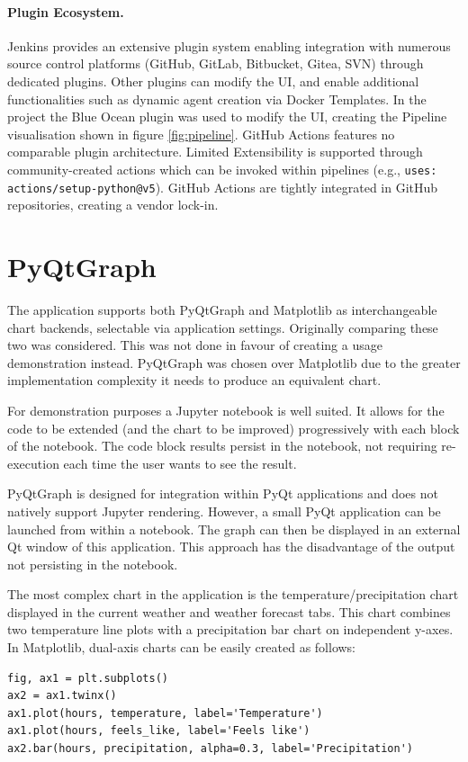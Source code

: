 \documentclass{llncs}
\begin{document}
\paragraph{Plugin Ecosystem.}
Jenkins provides an extensive plugin system enabling integration with numerous source control platforms (GitHub, GitLab, Bitbucket, Gitea, SVN) through dedicated plugins. Other plugins can modify the UI, and enable additional functionalities such as dynamic agent creation via Docker Templates. In the project the Blue Ocean plugin was used to modify the UI, creating the Pipeline visualisation shown in figure \ref{fig:pipeline}. GitHub Actions features no comparable plugin architecture. Limited Extensibility is supported through community-created actions which can be invoked within pipelines (e.g., \texttt{uses: actions/setup-python@v5}). GitHub Actions are tightly integrated in GitHub repositories, creating a vendor lock-in.


\section{PyQtGraph}
The application supports both PyQtGraph and Matplotlib as interchangeable chart backends, selectable via application settings. Originally comparing these two was considered. This was not done in favour of creating a usage demonstration instead. PyQtGraph was chosen over Matplotlib due to the greater implementation complexity it needs to produce an equivalent chart. 

For demonstration purposes a Jupyter notebook is well suited. It allows for the code to be extended (and the chart to be improved) progressively with each block of the notebook. The code block results persist in the notebook, not requiring re-execution each time the user wants to see the result. 

PyQtGraph is designed for integration within PyQt applications and does not natively support Jupyter rendering. However, a small PyQt application can be launched from within a notebook. The graph can then be displayed in an external Qt window of this application. This approach has the disadvantage of the output not persisting in the notebook.

The most complex chart in the application is the temperature/precipitation chart displayed in the current weather and weather forecast tabs. This chart combines two temperature line plots with a precipitation bar chart on independent y-axes. In Matplotlib, dual-axis charts can be easily created as follows:
\begin{Verbatim}
fig, ax1 = plt.subplots()
ax2 = ax1.twinx()
ax1.plot(hours, temperature, label='Temperature')
ax1.plot(hours, feels_like, label='Feels like')
ax2.bar(hours, precipitation, alpha=0.3, label='Precipitation')
\end{Verbatim}
\end{document}
